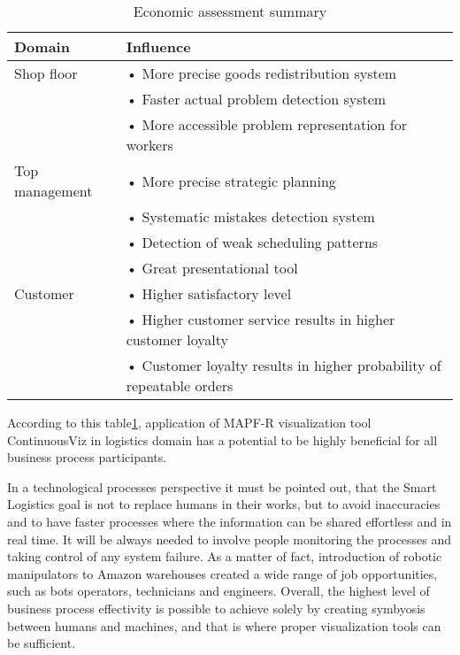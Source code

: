 \documentclass[thesis=B,english]{FITthesis}[2019/12/23]
\begin{document}
\begin{table}[h]\label{fig:float101}
\centering
\caption[Economic assessment summary]{Economic assessment summary}
\begin{tabular}{|l|l|}\hline
Domain		& Influence		
\tabularnewline \hline \hline
Shop floor		&• More	precise goods redistribution system
\tabularnewline 
\newline 	&• Faster actual problem detection system
\tabularnewline 
\newline 	&• More accessible problem representation for workers
\tabularnewline \hline
Top management	&•	More precise strategic planning \tabularnewline 
\newline	&• Systematic mistakes detection system	   
\tabularnewline 
\newline 	&•	Detection of weak scheduling patterns
\tabularnewline 
\newline 	&•	Great presentational tool
\tabularnewline \hline
Customer		&•	Higher satisfactory level	
\tabularnewline 
\newline 	&•	Higher customer service results in higher customer loyalty
\tabularnewline 
\newline 	&•	Customer loyalty results in higher probability of repeatable orders
\tabularnewline\hline 
\end{tabular}
\end{table}

According to this table\ref{fig:float101}, application of MAPF-R visualization tool ContinuousViz in logistics domain has a potential to be highly beneficial for all business process participants.

In a technological processes perspective it must be pointed out, that the Smart Logistics goal is not to replace humans in their works, but to avoid inaccuracies and to have faster processes where the information can be shared effortless and in real time. It will be always needed to involve people monitoring the processes and taking control of any system failure.  As a matter of fact, introduction of robotic manipulators to Amazon warehouses created a wide range of job opportunities, such as bots operators, technicians and engineers. Overall, the highest level of business process effectivity is possible to achieve solely by creating symbyosis between humans and machines, and that is where proper visualization tools can be sufficient.
\end{document}
